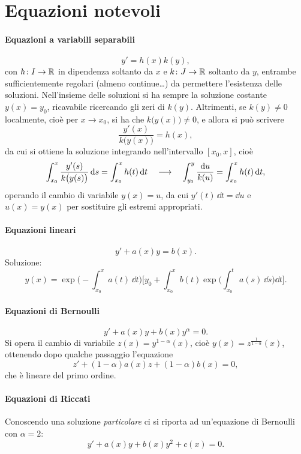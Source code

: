 \section{Equazioni notevoli}
\paragraph{Equazioni a variabili separabili}
\begin{equation}
y'=h(x)k(y),
\end{equation}
con $h\colon I\to\mathbb{R}$ in dipendenza soltanto da $x$ e $k\colon J\to\mathbb{R}$ soltanto da $y$, entrambe sufficientemente regolari (almeno continue\dots) da permettere l'esistenza delle soluzioni.
Nell'insieme delle soluzioni si ha sempre la soluzione costante $y(x)=y_0$, ricavabile ricercando gli zeri di $k(y)$. Altrimenti, se $k(y)\neq 0$ localmente, cioè per $x\to x_0$, si ha che $k\big(y(x)\big)\neq 0$, e allora si può scrivere
\[
\frac{y'(x)}{k\big(y(x)\big)}=h(x),
\]
da cui si ottiene la soluzione integrando nell'intervallo $[x_0,x]$, cioè
\[
\int_{x_0}^x\frac{y'(s)}{k\big(y(s)\big)}\,\textup{d} s=\int_{x_0}^xh(t)\,\textup{d} t\quad\longrightarrow\quad
\int_{y_0}^y\frac{\textup{d} u}{k(u)}=\int_{x_0}^xh(t)\,\textup{d} t,
\]
operando il cambio di variabile $y(x)=u$, da cui $y'(t)\,\dd t=\dd u$ e $u(x)=y(x)$ per sostituire gli estremi appropriati.
\paragraph{Equazioni lineari}
\begin{equation}
y'+a(x)y=b(x).
\end{equation}
Soluzione:
\begin{equation}
y(x)=\exp\Big(-\int_{x_0}^xa(t)\,\dd t\Big)\bigg[y_0+\int_{x_0}^xb(t)\exp\Big(\int_{x_0}^ta(s)\,\dd s\Big)\dd t\bigg].
\end{equation}
\paragraph{Equazioni di Bernoulli}
\begin{equation}
y'+a(x)y+b(x)y^\alpha=0.
\end{equation}
Si opera il cambio di variabile $z(x)=y^{1-\alpha}(x)$, cioè $y(x)=z^{\frac1{1-\alpha}}(x)$, ottenendo dopo qualche passaggio l'equazione
\begin{equation}
z'+(1-\alpha)a(x)z+(1-\alpha)b(x)=0,
\end{equation}
che è lineare del primo ordine.
\paragraph{Equazioni di Riccati}
Conoscendo una soluzione \emph{particolare} ci si riporta ad un'equazione di Bernoulli con $\alpha=2$:
\begin{equation}
y'+a(x)y+b(x)y^2+c(x)=0.
\end{equation}
